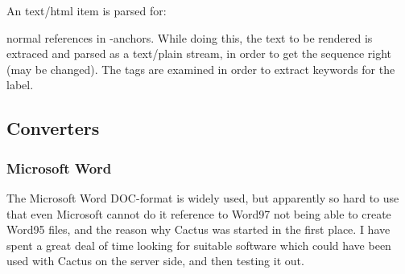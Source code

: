 An text/html item is parsed for:

normal references in -anchors.  While doing this, the text to
be rendered is extraced and parsed as a text/plain stream, in order to
get the sequence right (may be changed).  The  tags are
examined in order to extract keywords for the label.



\subsection{Converters}
\label{sec:converters}


\subsubsection{Microsoft Word}

The Microsoft Word DOC-format is widely used, but apparently so hard
to use that even Microsoft cannot do it \textsf{reference to Word97
  not being able to create Word95 files}, and the reason why Cactus
was started in the first place.  I have spent a great deal of time
looking for suitable software which could have been used with Cactus
on the server side, and then testing it out.

